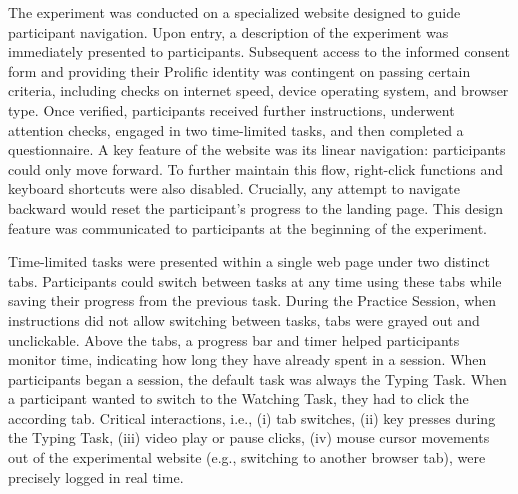 \documentclass[11pt,a4paper,oneside]{article}
\begin{document}
The experiment was conducted on a specialized website designed to guide participant navigation. Upon entry, a description of the experiment was immediately presented to participants. Subsequent access to the informed consent form and providing their Prolific identity was contingent on passing certain criteria, including checks on internet speed, device operating system, and browser type. Once verified, participants received further  instructions, underwent attention checks, engaged in two time-limited tasks, and then completed a questionnaire. A key feature of the website was its linear navigation: participants could only move forward. To further maintain this flow, right-click functions and keyboard shortcuts were also disabled. Crucially, any attempt to navigate backward would reset the participant's progress to the landing page. This design feature was communicated to participants at the beginning of the experiment. 

Time-limited tasks were presented within a single web page under two distinct tabs. Participants could switch between tasks at any time using these tabs while saving their progress from the previous task. During the Practice Session, when instructions did not allow switching between tasks, tabs were grayed out and unclickable. Above the tabs, a progress bar and timer helped participants monitor time, indicating how long they have already spent in a session. When participants began a session, the default task was always the Typing Task. When a participant wanted to switch to the Watching Task, they had to click the according tab. Critical interactions, i.e., (i) tab switches, (ii) key presses during the Typing Task, (iii) video play or pause clicks, (iv) mouse cursor movements out of the experimental website (e.g., switching to another browser tab), were precisely logged in real time.



\end{document}
